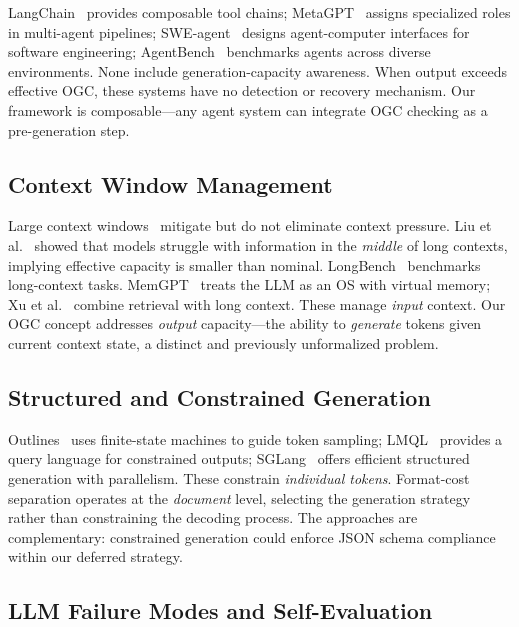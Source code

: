 \documentclass[11pt,twocolumn]{article}
\begin{document}
LangChain~\cite{chase2022langchain} provides composable tool chains;
MetaGPT~\cite{hong2023metagpt} assigns specialized roles in
multi-agent pipelines; SWE-agent~\cite{yang2024sweagent} designs
agent-computer interfaces for software engineering;
AgentBench~\cite{liu2023agentbench} benchmarks agents across
diverse environments.  None include generation-capacity awareness.
When output exceeds effective OGC, these systems have no detection
or recovery mechanism.  Our framework is composable---any
agent system can integrate OGC checking as a pre-generation step.

\subsection{Context Window Management}

Large context windows~\cite{anthropic2024claude} mitigate but
do not eliminate context pressure.
Liu et al.~\cite{liu2024lost} showed that models struggle with
information in the \emph{middle} of long contexts, implying
effective capacity is smaller than nominal.
LongBench~\cite{bai2023longbench} benchmarks long-context tasks.
MemGPT~\cite{packer2023memgpt} treats the LLM as an OS with
virtual memory; Xu et al.~\cite{xu2024retrieval} combine retrieval
with long context.  These manage \emph{input} context.  Our OGC
concept addresses \emph{output} capacity---the ability to
\emph{generate} tokens given current context state, a distinct
and previously unformalized problem.

\subsection{Structured and Constrained Generation}

Outlines~\cite{willard2023outlines} uses finite-state machines
to guide token sampling; LMQL~\cite{beurerkellner2023lmql}
provides a query language for constrained outputs;
SGLang~\cite{zheng2024sglang} offers efficient structured
generation with parallelism.  These constrain \emph{individual
tokens}.  Format-cost separation operates at the \emph{document}
level, selecting the generation strategy rather than constraining
the decoding process.  The approaches are complementary:
constrained generation could enforce JSON schema compliance
within our deferred strategy.

\subsection{LLM Failure Modes and Self-Evaluation}
\end{document}
